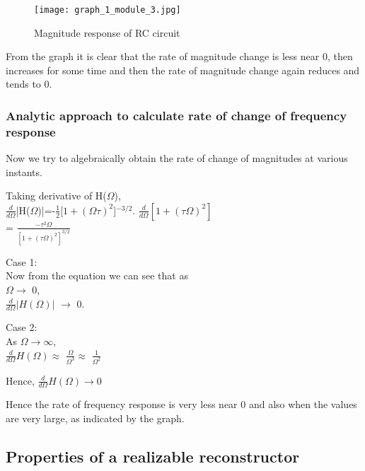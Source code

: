 \begin{figure}[ht]
\centering
\texttt{[image: graph\_1\_module\_3.jpg]}
\caption{Magnitude response of RC circuit}
\end{figure}

\noindent From the graph it is clear that the rate of magnitude change is less near 0, then increases for some time and then the rate of magnitude change again reduces and tends to 0. 

\subsubsection{Analytic approach to calculate rate of change of frequency response}

Now we try to algebraically obtain the rate of change of magnitudes at various instants.

Taking derivative of H($\Omega$),\\
$\frac{d}{d\Omega}$|H($\Omega$)|=-$\frac{1}{2}$[$1+(\Omega \tau)^2$]$^{-3/2}$. $\frac{d}{d\Omega}[1+(\tau \Omega)^2]$
\\      
\vspace*{5mm}
=
$\frac{-\tau^2\Omega}{[1+(\tau\Omega)^2]^{3/2}}$

\noindent
Case 1:\\
Now from the equation we can see that as \\ $\Omega \rightarrow$ 0,\\
$\frac{d}{d\Omega}|H(\Omega)|$ $\rightarrow$ 0.


\vspace*{0.3 cm} 
\noindent
Case 2:\\
As $\Omega \rightarrow \infty$,\\
$\frac{d}{d\Omega}H(\Omega) \approx$ $\frac{\Omega}{\Omega^3} \approx $ $\frac{1}{\Omega^2}$

\vspace*{3 mm}
\noindent
Hence, 
	$\frac{d}{d\Omega}H(\Omega) \rightarrow 0$
\\ 
\vspace*{0.5 cm}

Hence the rate of frequency response is very less near 0 and also when the values are very large, as indicated by the graph.

\subsection{Properties of a realizable reconstructor}

